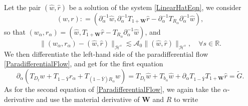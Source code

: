 \documentclass[10pt]{amsart}
\theoremstyle{remark}
\theoremstyle{definition}
\numberwithin{equation}{section}
\renewcommand{\H}{{\mathcal H }}
\newcommand{\bw}{\mathbf{W}}
\newcommand{\CalAZ}{{\mathcal{A}_0}}
\begin{document}
Let the pair $(\hat{w}, \hat{r})$ be a solution of the system \eqref{LinearHatEqn},  we consider
\begin{equation} \label{wrHatRelation}
    (w,r): = (\partial_\alpha^{-1}\hat{w}, \partial_\alpha^{-1}T_{1+\bw}\hat{r} - \partial_\alpha^{-1}T_{R_\alpha}\partial_\alpha^{-1}\hat{w}),
\end{equation}
so that $(w_\alpha, r_\alpha) = (\hat{w}, T_{1+\bw}\hat{r} - T_{R_\alpha}\partial_\alpha^{-1}\hat{w})$, and
\begin{equation} \label{wrInvertible}
   \|(w_\alpha, r_\alpha) -(\hat{w}, \hat{r})\|_{\H^s} \lesssim \CalAZ \| (\hat{w}, \hat{r})\|_{\H^s}, \quad \forall s\in \mathbb{R}.
\end{equation}
We then differentiate the left-hand side of the paradifferential flow \eqref{ParadifferentialFlow}, and get for the first equation
\begin{equation*}
    \partial_\alpha(T_{D_t}w+T_{1-\bar{Y}} r_\alpha + T_{(1-\bar{Y})R_\alpha}w) = T_{D_t}\hat{w} +T_{b_\alpha} \hat{w} + \partial_\alpha T_{1-\bar{Y}}T_{1+\bw} \hat{r} = \tilde{G}.
\end{equation*}
As for the second equation of \eqref{ParadifferentialFlow}, we again take the $\alpha$-derivative and use the material derivative of $\bw$ and $R$ to write
\end{document}
